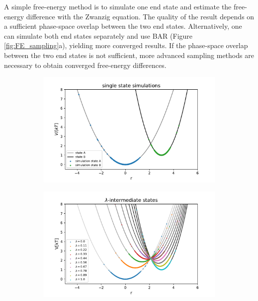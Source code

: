 A simple free-energy method is to simulate one end state and estimate the free-energy difference with the Zwanzig equation.\cite{Zwanzig1954} The quality of the result depends on a sufficient phase-space overlap between the two end states.\cite{Konig2018}
Alternatively, one can simulate both end states separately and use BAR\cite{Bennett1976} (Figure \ref{fig:FE_sampling}a), yielding more converged results.\cite{Konig2018}
If the phase-space overlap between the two end states is not sufficient, more advanced sampling methods are necessary to obtain converged free-energy differences.
%
\begin{figure}[H]
	\centering
	\begin{subfigure}{.45\textwidth}
		\caption{}
		\includegraphics[width=\linewidth]{fig/FE_example/freeEnergyPertubation.pdf} 
	\end{subfigure}
	\begin{subfigure}{.45\textwidth}
		\caption{}
		\includegraphics[width=\linewidth]{fig/FE_example/linear_coupled.pdf} 

\end{subfigure}
\end{figure}
